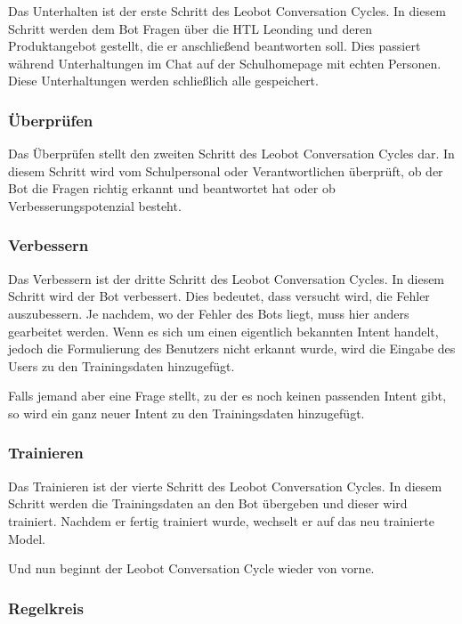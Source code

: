 Das Unterhalten ist der erste Schritt des Leobot Conversation Cycles.
In diesem Schritt werden dem Bot Fragen über die HTL Leonding und deren Produktangebot gestellt, die er anschließend beantworten soll.
Dies passiert während Unterhaltungen im Chat auf der Schulhomepage mit echten Personen.
Diese Unterhaltungen werden schließlich alle gespeichert.

\subsubsection{Überprüfen}

Das Überprüfen stellt den zweiten Schritt des Leobot Conversation Cycles dar.
In diesem Schritt wird vom Schulpersonal oder Verantwortlichen überprüft, ob der Bot die Fragen richtig erkannt und beantwortet hat oder ob Verbesserungspotenzial besteht.

\subsubsection{Verbessern}

Das Verbessern ist der dritte Schritt des Leobot Conversation Cycles.
In diesem Schritt wird der Bot verbessert.
Dies bedeutet, dass versucht wird, die Fehler auszubessern.
Je nachdem, wo der Fehler des Bots liegt, muss hier anders gearbeitet werden.
Wenn es sich um einen eigentlich bekannten Intent handelt, jedoch die Formulierung des Benutzers nicht erkannt wurde, wird die Eingabe des Users zu den Trainingsdaten hinzugefügt.

Falls jemand aber eine Frage stellt, zu der es noch keinen passenden Intent gibt, so wird ein ganz neuer Intent zu den Trainingsdaten hinzugefügt.

\subsubsection{Trainieren}

Das Trainieren ist der vierte Schritt des Leobot Conversation Cycles.
In diesem Schritt werden die Trainingsdaten an den Bot übergeben und dieser wird trainiert.
Nachdem er fertig trainiert wurde, wechselt er auf das neu trainierte Model.

Und nun beginnt der Leobot Conversation Cycle wieder von vorne.

\subsubsection{Regelkreis}

